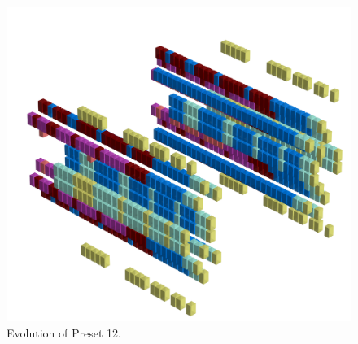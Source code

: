 \clearpage                                                                 
\begin{figure}[H]                                                          
  \centering                                                             
  \begin{adjustbox}{width=14cm,center}                                   
  \includegraphics[width=14cm]{src/presets/pattern12-45.png}%
  \end{adjustbox}                                                        
\caption{Evolution of Preset 12.}                                           
\end{figure}                                                               
\clearpage                                                                 
                                                                           

